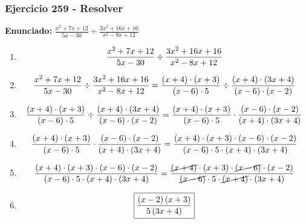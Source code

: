 \documentclass[11pt,a4paper]{article}
\newcommand{\fitmath}[1]{%
\[
\setbox0=\hbox{$\displaystyle #1$}%
\ifdim\wd0>\linewidth
\resizebox{\linewidth}{!}{$\displaystyle #1$}%
\else
#1%
\fi
\]
}
\begin{document}
\subsubsection*{Ejercicio 259 - Resolver}
\textbf{Enunciado:} $ \frac{x^{2} + 7 x + 12}{5 x - 30} \div \frac{3 x^{2} + 16 x + 16}{x^{2} - 8 x + 12} $\par
\begin{enumerate}[leftmargin=2em]
\item \fitmath{\frac{x^{2} + 7 x + 12}{5 x - 30} \div \frac{3 x^{2} + 16 x + 16}{x^{2} - 8 x + 12}}
\item \fitmath{\frac{x^{2} + 7 x + 12}{5 x - 30} \div \frac{3 x^{2} + 16 x + 16}{x^{2} - 8 x + 12}= \frac{\left(x + 4\right)\cdot \left(x + 3\right)}{\left(x - 6\right)\cdot 5} \div \frac{\left(x + 4\right)\cdot \left(3 x + 4\right)}{\left(x - 6\right)\cdot \left(x - 2\right)}}
\item \fitmath{\frac{\left(x + 4\right)\cdot \left(x + 3\right)}{\left(x - 6\right)\cdot 5}\div \frac{\left(x + 4\right)\cdot \left(3 x + 4\right)}{\left(x - 6\right)\cdot \left(x - 2\right)}= \frac{\left(x + 4\right)\cdot \left(x + 3\right)}{\left(x - 6\right)\cdot 5}\cdot \frac{\left(x - 6\right)\cdot \left(x - 2\right)}{\left(x + 4\right)\cdot \left(3 x + 4\right)}}
\item \fitmath{\frac{\left(x + 4\right)\cdot \left(x + 3\right)}{\left(x - 6\right)\cdot 5}\cdot \frac{\left(x - 6\right)\cdot \left(x - 2\right)}{\left(x + 4\right)\cdot \left(3 x + 4\right)}= \frac{\left(x + 4\right)\cdot \left(x + 3\right)\cdot \left(x - 6\right)\cdot \left(x - 2\right)}{\left(x - 6\right)\cdot 5\cdot \left(x + 4\right)\cdot \left(3 x + 4\right)}}
\item \fitmath{\frac{\left(x + 4\right)\cdot \left(x + 3\right)\cdot \left(x - 6\right)\cdot \left(x - 2\right)}{\left(x - 6\right)\cdot 5\cdot \left(x + 4\right)\cdot \left(3 x + 4\right)}= \frac{\cancel{\left(x + 4\right)}\cdot \left(x + 3\right)\cdot \cancel{\left(x - 6\right)}\cdot \left(x - 2\right)}{\cancel{\left(x - 6\right)}\cdot 5\cdot \cancel{\left(x + 4\right)}\cdot \left(3 x + 4\right)}}
\item \fitmath{\boxed{\frac{\left(x - 2\right) \left(x + 3\right)}{5 \left(3 x + 4\right)}}}
\end{enumerate}

\vspace{0.12cm}
\end{document}
